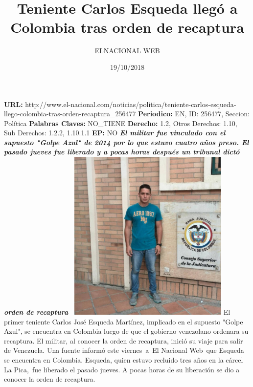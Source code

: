 \documentclass{article}%
\title{\textbf{Teniente Carlos Esqueda llegó a Colombia tras orden de recaptura}}%
\author{ELNACIONAL WEB}%
\date{19/10/2018}%
\begin{document}
%
\normalsize%
\maketitle%
\textbf{URL: }%
http://www.el{-}nacional.com/noticias/politica/teniente{-}carlos{-}esqueda{-}llego{-}colombia{-}tras{-}orden{-}recaptura\_256477\newline%
%
\textbf{Periodico: }%
EN, %
ID: %
256477, %
Seccion: %
Política\newline%
%
\textbf{Palabras Claves: }%
NO\_TIENE\newline%
%
\textbf{Derecho: }%
1.2, %
Otros Derechos: %
1.10, %
Sub Derechos: %
1.2.2, 1.10.1.1\newline%
%
\textbf{EP: }%
NO\newline%
\newline%
%
\textbf{\textit{El militar fue vinculado con el supuesto "Golpe Azul" de 2014 por lo que estuvo cuatro años preso. El pasado jueves fue liberado y a pocas horas después un tribunal dictó orden de recaptura~}}%
\newline%
\newline%
%
\includegraphics[width=300px]{157.jpg}%
\newline%
%
El primer teniente Carlos José Esqueda Martínez, implicado en el supuesto "Golpe Azul", se encuentra en Colombia luego de que el gobierno venezolano ordenara su recaptura.%
\newline%
%
El militar, al conocer la orden de recaptura, inició su viaje para salir de Venezuela. Una fuente informó este viernes~a~El Nacional Web~que Esqueda se encuentra en Colombia.%
\newline%
%
Esqueda, quien estuvo recluido tres años en la cárcel La Pica,~fue liberado el pasado jueves. A pocas horas de su liberación se dio a conocer la orden de recaptura.%
\newline%
%
\end{document}
